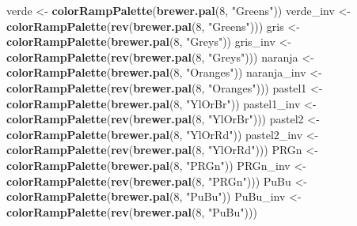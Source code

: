 \documentclass[11pt,]{article}
\newenvironment{Shaded}{\begin{snugshade}}{\end{snugshade}}
\newcommand{\KeywordTok}[1]{\textcolor[rgb]{0.13,0.29,0.53}{\textbf{#1}}}
\newcommand{\DecValTok}[1]{\textcolor[rgb]{0.00,0.00,0.81}{#1}}
\newcommand{\StringTok}[1]{\textcolor[rgb]{0.31,0.60,0.02}{#1}}
\newcommand{\NormalTok}[1]{#1}
\begin{document}
\begin{Shaded}
\begin{Highlighting}[]
\NormalTok{verde <-}\StringTok{ }\KeywordTok{colorRampPalette}\NormalTok{(}\KeywordTok{brewer.pal}\NormalTok{(}\DecValTok{8}\NormalTok{, }\StringTok{"Greens"}\NormalTok{))}
\NormalTok{verde_inv <-}\StringTok{ }\KeywordTok{colorRampPalette}\NormalTok{(}\KeywordTok{rev}\NormalTok{(}\KeywordTok{brewer.pal}\NormalTok{(}\DecValTok{8}\NormalTok{, }\StringTok{"Greens"}\NormalTok{)))}
\NormalTok{gris <-}\StringTok{ }\KeywordTok{colorRampPalette}\NormalTok{(}\KeywordTok{brewer.pal}\NormalTok{(}\DecValTok{8}\NormalTok{, }\StringTok{"Greys"}\NormalTok{))}
\NormalTok{gris_inv <-}\StringTok{ }\KeywordTok{colorRampPalette}\NormalTok{(}\KeywordTok{rev}\NormalTok{(}\KeywordTok{brewer.pal}\NormalTok{(}\DecValTok{8}\NormalTok{, }\StringTok{"Greys"}\NormalTok{)))}
\NormalTok{naranja <-}\StringTok{ }\KeywordTok{colorRampPalette}\NormalTok{(}\KeywordTok{brewer.pal}\NormalTok{(}\DecValTok{8}\NormalTok{, }\StringTok{"Oranges"}\NormalTok{))}
\NormalTok{naranja_inv <-}\StringTok{ }\KeywordTok{colorRampPalette}\NormalTok{(}\KeywordTok{rev}\NormalTok{(}\KeywordTok{brewer.pal}\NormalTok{(}\DecValTok{8}\NormalTok{, }\StringTok{"Oranges"}\NormalTok{)))}
\NormalTok{pastel1 <-}\StringTok{ }\KeywordTok{colorRampPalette}\NormalTok{(}\KeywordTok{brewer.pal}\NormalTok{(}\DecValTok{8}\NormalTok{, }\StringTok{"YlOrBr"}\NormalTok{))}
\NormalTok{pastel1_inv <-}\StringTok{ }\KeywordTok{colorRampPalette}\NormalTok{(}\KeywordTok{rev}\NormalTok{(}\KeywordTok{brewer.pal}\NormalTok{(}\DecValTok{8}\NormalTok{, }\StringTok{"YlOrBr"}\NormalTok{)))}
\NormalTok{pastel2 <-}\StringTok{ }\KeywordTok{colorRampPalette}\NormalTok{(}\KeywordTok{brewer.pal}\NormalTok{(}\DecValTok{8}\NormalTok{, }\StringTok{"YlOrRd"}\NormalTok{))}
\NormalTok{pastel2_inv <-}\StringTok{ }\KeywordTok{colorRampPalette}\NormalTok{(}\KeywordTok{rev}\NormalTok{(}\KeywordTok{brewer.pal}\NormalTok{(}\DecValTok{8}\NormalTok{, }\StringTok{"YlOrRd"}\NormalTok{)))}
\NormalTok{PRGn <-}\StringTok{ }\KeywordTok{colorRampPalette}\NormalTok{(}\KeywordTok{brewer.pal}\NormalTok{(}\DecValTok{8}\NormalTok{, }\StringTok{"PRGn"}\NormalTok{))}
\NormalTok{PRGn_inv <-}\StringTok{ }\KeywordTok{colorRampPalette}\NormalTok{(}\KeywordTok{rev}\NormalTok{(}\KeywordTok{brewer.pal}\NormalTok{(}\DecValTok{8}\NormalTok{, }\StringTok{"PRGn"}\NormalTok{)))}
\NormalTok{PuBu <-}\StringTok{ }\KeywordTok{colorRampPalette}\NormalTok{(}\KeywordTok{brewer.pal}\NormalTok{(}\DecValTok{8}\NormalTok{, }\StringTok{"PuBu"}\NormalTok{))}
\NormalTok{PuBu_inv <-}\StringTok{ }\KeywordTok{colorRampPalette}\NormalTok{(}\KeywordTok{rev}\NormalTok{(}\KeywordTok{brewer.pal}\NormalTok{(}\DecValTok{8}\NormalTok{, }\StringTok{"PuBu"}\NormalTok{)))}

\end{Highlighting}
\end{Shaded}
\end{document}
